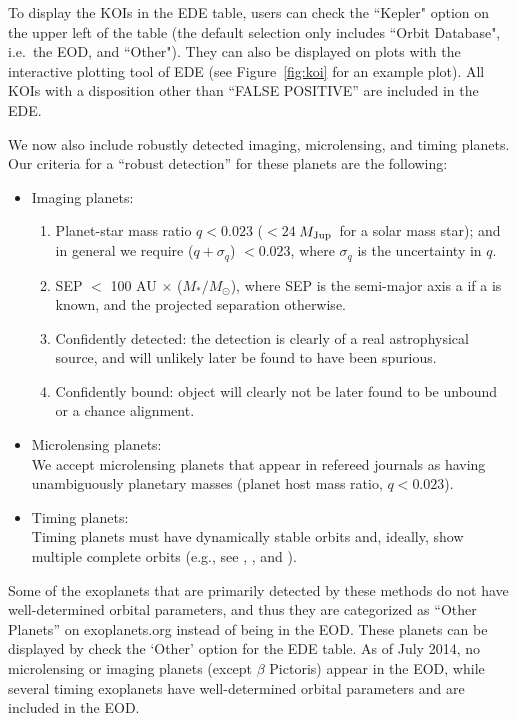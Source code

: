 \documentclass[11pt,preprint]{aastex}
\def\mjup{$M_{\rm Jup}$}
\begin{document}
\begin{CJK*}{UTF8}{gbsn}
To display the KOIs in the EDE table, users can check the ``Kepler" option on
the upper left of the table (the default selection only includes ``Orbit
Database", i.e.~the EOD, and ``Other"). They can also be displayed on
plots with the interactive plotting tool of EDE (see
Figure~\ref{fig:koi} for an example plot).  All KOIs with a
disposition other than ``FALSE POSITIVE'' are included in the EDE.

We now also include robustly detected imaging, microlensing,
and timing planets.  Our criteria for a ``robust detection'' for these
planets are the
following:

\begin{itemize}
\item Imaging planets:
\begin{enumerate}
\item Planet-star mass ratio $q < 0.023$ ($< 24\ $\mjup\ for a solar
  mass star); and in general we require ($q+\sigma_q$) $< 0.023$,
  where $\sigma_q$ is the uncertainty in $q$.
\item SEP $<$ 100 AU $\times$ ($M_*/M_\odot$), where SEP is the
  semi-major axis a if a is known, and the projected separation
  otherwise.
\item Confidently detected: the detection is clearly of a real
  astrophysical source, and will unlikely later be found to have been
  spurious.
\item Confidently bound: object will clearly not
  be later found to be unbound or a chance alignment.

\end{enumerate}
\item Microlensing planets:\\
  We accept microlensing planets that appear in refereed journals as
  having unambiguously planetary masses (planet host mass ratio,
  $q<0.023$). 

\item Timing planets:\\
  Timing planets must have dynamically stable orbits and, ideally, show
  multiple complete orbits (e.g., see \citealt{Wittenmyer2012},
  \citealt{Horner2012}, and \citealt{Wittenmyer2013}). 

\end{itemize}
Some of the exoplanets that are primarily detected by these methods do
not have well-determined orbital parameters, and thus they are
categorized as ``Other Planets'' on exoplanets.org instead of being in
the EOD. These planets can be displayed by check the `Other' option
for the EDE table. As of July 2014, no microlensing or imaging
planets (except $\beta$ Pictoris) appear in the EOD, while several timing exoplanets have
well-determined orbital parameters and are included in the
EOD.



\end{CJK*}
\end{document}
